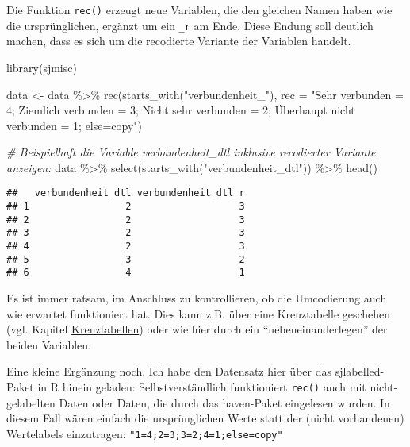 \documentclass[
]{book}
\newenvironment{Shaded}{\begin{snugshade}}{\end{snugshade}}
\newcommand{\AttributeTok}[1]{\textcolor[rgb]{0.77,0.63,0.00}{#1}}
\newcommand{\CommentTok}[1]{\textcolor[rgb]{0.56,0.35,0.01}{\textit{#1}}}
\newcommand{\FunctionTok}[1]{\textcolor[rgb]{0.00,0.00,0.00}{#1}}
\newcommand{\NormalTok}[1]{#1}
\newcommand{\OtherTok}[1]{\textcolor[rgb]{0.56,0.35,0.01}{#1}}
\newcommand{\SpecialCharTok}[1]{\textcolor[rgb]{0.00,0.00,0.00}{#1}}
\newcommand{\StringTok}[1]{\textcolor[rgb]{0.31,0.60,0.02}{#1}}
\begin{document}
Die Funktion \texttt{rec()} erzeugt neue Variablen, die den gleichen Namen haben wie die ursprünglichen, ergänzt um ein \texttt{\_r} am Ende. Diese Endung soll deutlich machen, dass es sich um die recodierte Variante der Variablen handelt.

\begin{Shaded}
\begin{Highlighting}[]
\FunctionTok{library}\NormalTok{(sjmisc)}

\NormalTok{data }\OtherTok{\textless{}{-}}\NormalTok{ data }\SpecialCharTok{\%\textgreater{}\%} 
  \FunctionTok{rec}\NormalTok{(}\FunctionTok{starts\_with}\NormalTok{(}\StringTok{"verbundenheit\_"}\NormalTok{), }\AttributeTok{rec =} \StringTok{"Sehr verbunden = 4;}
\StringTok{                                             Ziemlich verbunden = 3;}
\StringTok{                                             Nicht sehr verbunden = 2; }
\StringTok{                                             Überhaupt nicht verbunden = 1;}
\StringTok{                                             else=copy"}\NormalTok{) }

\CommentTok{\# Beispielhaft die Variable verbundenheit\_dtl inklusive recodierter Variante anzeigen:}
\NormalTok{data }\SpecialCharTok{\%\textgreater{}\%} 
  \FunctionTok{select}\NormalTok{(}\FunctionTok{starts\_with}\NormalTok{(}\StringTok{"verbundenheit\_dtl"}\NormalTok{)) }\SpecialCharTok{\%\textgreater{}\%} 
  \FunctionTok{head}\NormalTok{()}
\end{Highlighting}
\end{Shaded}

\begin{verbatim}
##   verbundenheit_dtl verbundenheit_dtl_r
## 1                 2                   3
## 2                 2                   3
## 3                 2                   3
## 4                 2                   3
## 5                 3                   2
## 6                 4                   1
\end{verbatim}

Es ist immer ratsam, im Anschluss zu kontrollieren, ob die Umcodierung auch wie erwartet funktioniert hat. Dies kann z.B. über eine Kreuztabelle geschehen (vgl. Kapitel \protect\hyperlink{kreuztabellen}{Kreuztabellen}) oder wie hier durch ein ``nebeneinanderlegen'' der beiden Variablen.

Eine kleine Ergänzung noch. Ich habe den Datensatz hier über das sjlabelled-Paket in R hinein geladen: Selbstverständlich funktioniert \texttt{rec()} auch mit nicht-gelabelten Daten oder Daten, die durch das haven-Paket eingelesen wurden. In diesem Fall wären einfach die ursprünglichen Werte statt der (nicht vorhandenen) Wertelabels einzutragen: \texttt{"1=4;2=3;3=2;4=1;else=copy"}
\end{document}
